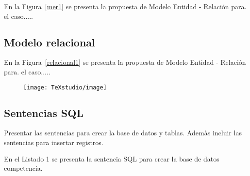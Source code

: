 \documentclass{article}
\begin{document}
        En la Figura~\ref{mer1} se presenta la propuesta de Modelo Entidad - Relación para. el caso.....
        
     
        

    \subsection{Modelo relacional}
        En la Figura~\ref{relacional1} se presenta la propuesta de Modelo Entidad - Relación para. el caso.....
        
       
       \begin{figure}
       	\centering
       	\texttt{[image: TeXstudio/image]}
       	\caption{}
       	\label{fig:image}
       \end{figure}
        \newpage

    \subsection{Sentencias SQL}
        Presentar las sentencias para crear la base de datos y tablas.
        Ademàs incluir las sentencias para insertar registros.

        En el Listado 1 se presenta la sentencia SQL para crear la base de datos competencia.
        
\end{document}
